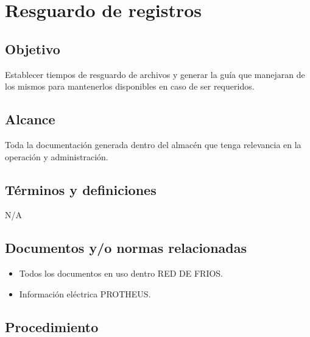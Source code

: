 \renewcommand{\MayorVer}{2}
\renewcommand{\MenorVer}{1}
\renewcommand{\Codigo}{PSA-1-PROG} %
\renewcommand{\FechaPub}{2023--01}
\renewcommand{\Titulo}{Resguardo de registros}

\section{\Titulo}


\subsection{Objetivo}

Establecer tiempos de resguardo de archivos y generar la guía que manejaran de los mismos para mantenerlos disponibles en caso de ser requeridos.

\subsection{Alcance}

Toda la documentación generada dentro del almacén que tenga relevancia en la operación y administración.

\subsection{Términos y definiciones}

N/A

\subsection{Documentos y/o normas relacionadas}

\begin{itemize}
	\item Todos los documentos en uso dentro RED DE FRIOS.
	\item Información eléctrica PROTHEUS.
\end{itemize}

\subsection{Procedimiento}

